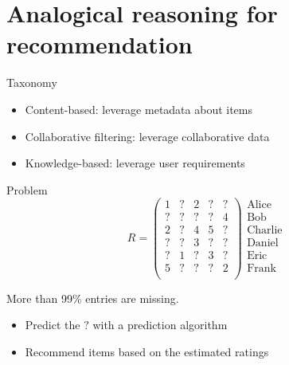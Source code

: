 \documentclass{beamer}
\begin{document}
\section[Application to recommendation]{Analogical reasoning for recommendation}

\begin{frame}{Taxonomy}
  \begin{itemize}
    \item Content-based: leverage metadata about items
    \item \alert{Collaborative filtering}: leverage collaborative data
    \item Knowledge-based: leverage user requirements
  \end{itemize}
\end{frame}

\begin{frame}{Problem}
$$
R= \begin{pmatrix}
1 & ? & 2 & ? & ?\\
? & ? & ? & ? & 4\\
2 & ? & 4 & 5 & ?\\
? & ? & 3 & ? & ?\\
? & 1 & ? & 3 & ?\\
5 & ? & ? & ? & 2\\
\end{pmatrix}
\begin{matrix}
\text{Alice}\\
\text{Bob}\\
\text{Charlie}\\
\text{Daniel}\\
\text{Eric}\\
\text{Frank}\\
\end{matrix}
$$

More than 99\% entries are missing.
\begin{itemize}
  \item Predict the $?$ with a prediction algorithm
  \item Recommend items based on the estimated ratings
\end{itemize}
\end{frame}
\end{document}
